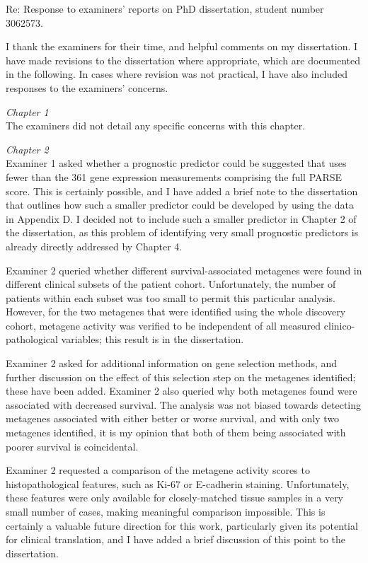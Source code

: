 \documentclass[a4paper,12pt,stdletter,sigleft]{newlfm}
\begin{document}
\begin{newlfm}

Re: Response to examiners' reports on PhD dissertation, student number 3062573.

I thank the examiners for their time, and helpful comments on my dissertation.  I have made revisions to the dissertation where appropriate, which are documented in the following.  In cases where revision was not practical, I have also included responses to the examiners' concerns.

\emph{Chapter 1} \\
The examiners did not detail any specific concerns with this chapter.

\emph{Chapter 2} \\
Examiner 1 asked whether a prognostic predictor could be suggested that uses fewer than the 361 gene expression measurements comprising the full PARSE score.  This is certainly possible, and I have added a brief note to the dissertation that outlines how such a smaller predictor could be developed by using the data in Appendix D.  I decided not to include such a smaller predictor in Chapter 2 of the dissertation, as this problem of identifying very small prognostic predictors is already directly addressed by Chapter 4.

Examiner 2 queried whether different survival-associated metagenes were found in different clinical subsets of the patient cohort.  Unfortunately, the number of patients within each subset was too small to permit this particular analysis.  However, for the two metagenes that were identified using the whole discovery cohort, metagene activity was verified to be independent of all measured clinico-pathological variables; this result is in the dissertation.

Examiner 2 asked for additional information on gene selection methods, and further discussion on the effect of this selection step on the metagenes identified; these have been added.  Examiner 2 also queried why both metagenes found were associated with decreased survival.  The analysis was not biased towards detecting metagenes associated with either better or worse survival, and with only two metagenes identified, it is my opinion that both of them being associated with poorer survival is coincidental.

Examiner 2 requested a comparison of the metagene activity scores to histopathological features, such as Ki-67 or E-cadherin staining.  Unfortunately, these features were only available for closely-matched tissue samples in a very small number of cases, making meaningful comparison impossible.  This is certainly a valuable future direction for this work, particularly given its potential for clinical translation, and I have added a brief discussion of this point to the dissertation.


\end{newlfm}
\end{document}
